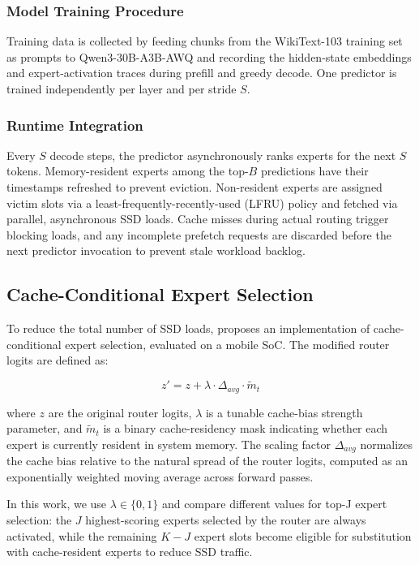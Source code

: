 \subsubsection{Model Training Procedure}

Training data is collected by feeding chunks from the WikiText-103 training set \cite{merity2016pointersentinelmixturemodels} as prompts to Qwen3-30B-A3B-AWQ and recording the hidden-state embeddings and expert-activation traces during prefill and greedy decode. One predictor is trained independently per layer and per stride $S$.

\subsubsection{Runtime Integration}
\label{sec:prefetch_runtime}
Every $S$ decode steps, the predictor asynchronously ranks experts for the next $S$ tokens. Memory-resident experts among the top-$B$ predictions have their timestamps refreshed to prevent eviction. Non-resident experts are assigned victim slots via a least-frequently-recently-used (LFRU) policy and fetched via parallel, asynchronous SSD loads. Cache misses during actual routing trigger blocking loads, and any incomplete prefetch requests are discarded before the next predictor invocation to prevent stale workload backlog.

\subsection{Cache-Conditional Expert Selection}
To reduce the total number of SSD loads, \citet{skliar2025mixturecacheconditionalexpertsefficient} proposes an implementation of cache-conditional expert selection, evaluated on a mobile SoC. The modified router logits are defined as:

\begin{equation}
    \label{eq:top_j}
    z' = z + \lambda \cdot \Delta_{avg} \cdot \tilde{m}_t
\end{equation}


where $z$ are the original router logits, $\lambda$ is a tunable cache-bias strength parameter, and $\tilde{m}_t$ is a binary cache-residency mask indicating whether each expert is currently resident in system memory. The scaling factor $\Delta_{avg}$ normalizes the cache bias relative to the natural spread of the router logits, computed as an exponentially weighted moving average across forward passes.

In this work, we use $\lambda \in \{0,1\}$ and compare different values for top-J expert selection: the $J$ highest-scoring experts selected by the router are always activated, while the remaining $K-J$ expert slots become eligible for substitution with cache-resident experts to reduce SSD traffic. 


